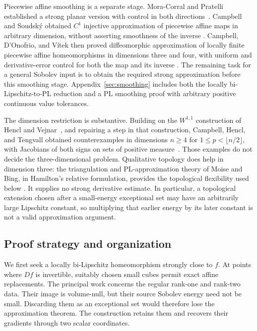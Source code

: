 \documentclass[11pt]{article}
\numberwithin{equation}{section}
\theoremstyle{definition}
\theoremstyle{remark}
\begin{document}
Piecewise affine smoothing is a separate stage.  Mora-Corral and
Pratelli established a strong planar version with control in both
directions~\cite{MoraCorralPratelli2014}.  Campbell and Soudsk\'y
obtained $C^1$ injective approximation of piecewise affine maps in
arbitrary dimension, without asserting smoothness of the inverse
\cite{CampbellSoudsky2021}.  Campbell, D'Onofrio, and V\'itek then
proved diffeomorphic approximation of locally finite piecewise affine
homeomorphisms in dimensions three and four, with uniform and
derivative-error control for both the map and its inverse
\cite[Theorem~A]{CampbellDOnofrioVitek2026}.  The remaining task for a
general Sobolev input is to obtain the required strong approximation
before this smoothing stage.  Appendix~\ref{sec:smoothing} includes
both the locally bi-Lipschitz-to-PL reduction and a PL smoothing proof
with arbitrary positive continuous value tolerances.

The dimension restriction is substantive.  Building on the $W^{1,1}$
construction of Hencl and Vejnar~\cite{HenclVejnar2016}, and repairing
a step in that construction, Campbell, Hencl, and Tengvall obtained
counterexamples in dimensions $n\ge4$ for
$1\le p<\lfloor n/2\rfloor$, with Jacobians of both signs on sets
of positive measure~\cite{CampbellHenclTengvall2018}.  Those examples
do not decide the three-dimensional problem.  Qualitative topology
does help in dimension three: the triangulation and PL-approximation
theory of Moise and Bing, in Hamilton's relative formulation,
provides the topological flexibility used below
\cite{Moise1952Approximation,Moise1952Triangulation,Bing1959,Hamilton1976}.
It supplies no strong derivative estimate.  In particular, a
topological extension chosen after a small-energy exceptional set may
have an arbitrarily large Lipschitz constant, so multiplying that
earlier energy by its later constant is not a valid approximation
argument.

\subsection{Proof strategy and organization}

We first seek a locally bi-Lipschitz homeomorphism strongly close to
$f$.  At points where $Df$ is invertible, suitably chosen small
cubes permit exact affine replacements.  The principal work concerns
the regular rank-one and rank-two data.  Their image is volume-null,
but their source Sobolev energy need not be small.  Discarding them
as an exceptional set would therefore lose the approximation theorem.
The construction retains them and recovers their gradients through
two scalar coordinates.
\end{document}
